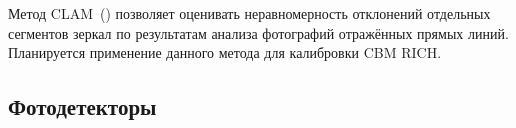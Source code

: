 Метод CLAM~(\cite{CLAM}) позволяет оценивать неравномерность отклонений отдельных сегментов зеркал по результатам анализа фотографий отражённых прямых линий. Планируется применение данного метода для калибровки CBM RICH.



%                                      

\subsection{Фотодетекторы}\label{sec:CbmRichCamera}

